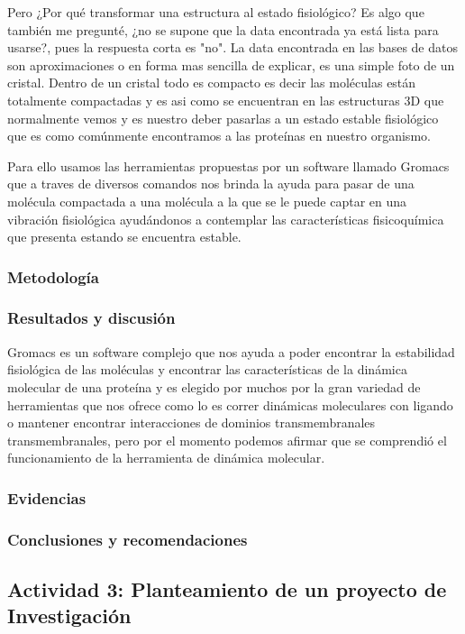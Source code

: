 \documentclass[a4paper, 12pt]{article}
\begin{document}
         Pero ¿Por qué transformar una estructura al estado fisiológico? Es algo que también me pregunté, ¿no se supone que la data encontrada ya está lista para usarse?, pues la respuesta corta es "no". La data encontrada en las bases de datos son aproximaciones o en forma mas sencilla de explicar, es una simple foto de un cristal. Dentro de un cristal todo es compacto es decir las moléculas están totalmente compactadas y es asi como se encuentran en las estructuras 3D que normalmente vemos y es nuestro deber pasarlas a un estado estable fisiológico que es como comúnmente encontramos a las proteínas en nuestro organismo.
         
         Para ello usamos las herramientas propuestas por un software llamado Gromacs que a traves de diversos comandos nos brinda la ayuda para pasar de una molécula compactada a una molécula a la que se le puede captar en una vibración fisiológica ayudándonos a contemplar las características fisicoquímica que presenta estando se encuentra estable.

         \subsubsection{Metodología}
         
         \subsubsection{Resultados y discusión}
         Gromacs es un software complejo que nos ayuda a poder encontrar la estabilidad fisiológica de las moléculas y encontrar las características de la dinámica molecular de una proteína y es elegido por muchos por la gran variedad de herramientas que nos ofrece como lo es correr dinámicas moleculares con ligando o mantener encontrar interacciones de dominios transmembranales transmembranales, pero por el momento podemos afirmar que se comprendió el funcionamiento de la herramienta de dinámica molecular.
         \subsubsection{Evidencias}

         \subsubsection{Conclusiones y recomendaciones}  

    \subsection{Actividad 3: Planteamiento de un proyecto de Investigación}
\end{document}
